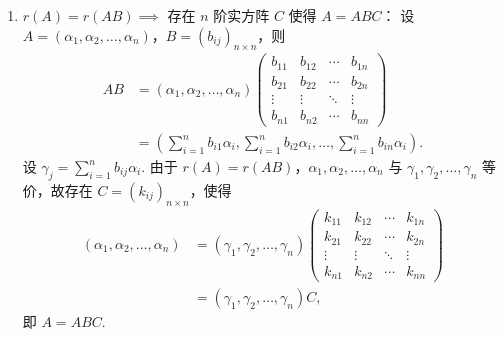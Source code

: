 \documentclass[UTF8,12pt,a4paper,fontset=fandol]{ctexart}
\begin{document}
\begin{solve}
\begin{enumerate}
                \item $r(A) = r(AB) \implies$ 存在 $n$ 阶实方阵 $C$ 使得 $A = ABC$：
                    设 $A = (\alpha_1, \alpha_2, \ldots, \alpha_n)$，$B = (b_{ij})_{n \times n}$，则
                    \begin{align*}
                        AB &= (\alpha_1, \alpha_2, \ldots, \alpha_n) \begin{pmatrix}
                                  b_{11} & b_{12} & \cdots & b_{1n} \\
                                  b_{21} & b_{22} & \cdots & b_{2n} \\
                                  \vdots & \vdots & \ddots & \vdots \\
                                  b_{n1} & b_{n2} & \cdots & b_{nn}
                              \end{pmatrix} \\
                           &= \left( \sum\limits_{i=1}^n b_{i1} \alpha_i, \sum\limits_{i=1}^n b_{i2} \alpha_i, \ldots, \sum\limits_{i=1}^n b_{in} \alpha_i \right).
                    \end{align*}
                    设 $\gamma_j = \sum\limits_{i=1}^n b_{ij} \alpha_i$. 由于 $r(A) = r(AB)$，$\alpha_1, \alpha_2, \ldots, \alpha_n$ 与 $\gamma_1, \gamma_2, \ldots, \gamma_n$ 等价，故存在 $C = (k_{ij})_{n \times n}$，使得
                    \begin{align*}
                        (\alpha_1, \alpha_2, \ldots, \alpha_n)
                        &= (\gamma_1, \gamma_2, \ldots, \gamma_n) \begin{pmatrix}
                            k_{11} & k_{12} & \cdots & k_{1n} \\
                            k_{21} & k_{22} & \cdots & k_{2n} \\
                            \vdots & \vdots & \ddots & \vdots \\
                            k_{n1} & k_{n2} & \cdots & k_{nn}
                        \end{pmatrix} \\
                        &= (\gamma_1, \gamma_2, \ldots, \gamma_n) C,
                    \end{align*}
                    即 $A = ABC$.
            \end{enumerate}
\end{solve}
\end{document}

